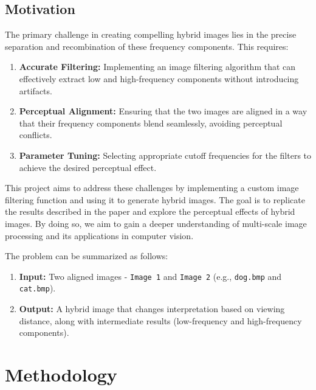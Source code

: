 \documentclass[12pt]{report}
\begin{document}
\section{Motivation}
The primary challenge in creating compelling hybrid images lies in the precise separation and recombination of these frequency components. This requires:
\vspace{-1.25em}
\begin{enumerate}
	\setlength\itemsep{-1.05em}

	\item{\textbf{Accurate Filtering: }}Implementing an image filtering algorithm that can effectively extract low and high-frequency components without introducing artifacts.
	\item{\textbf{Perceptual Alignment: }}Ensuring that the two images are aligned in a way that their frequency components blend seamlessly, avoiding perceptual conflicts.
	\item{\textbf{Parameter Tuning: }}Selecting appropriate cutoff frequencies for the filters to achieve the desired perceptual effect.

\end{enumerate}

\noindent This project aims to address these challenges by implementing a custom image filtering function and using it to generate hybrid images. The goal is to replicate the results described in the paper \cite{oliva2006} and explore the perceptual effects of hybrid images. By doing so, we aim to gain a deeper understanding of multi-scale image processing and its applications in computer vision.

\noindent The problem can be summarized as follows:

\vspace{-1.25em}
\begin{enumerate}
	\setlength\itemsep{-1.05em}

	\item{\textbf{Input: }}Two aligned images - \texttt{Image 1} and \texttt{Image 2} (e.g., \texttt{dog.bmp} and \texttt{cat.bmp}).
	\item{\textbf{Output: }}A hybrid image that changes interpretation based on viewing distance, along with intermediate results (low-frequency and high-frequency components).

\end{enumerate}


\chapter{Methodology}
\end{document}
